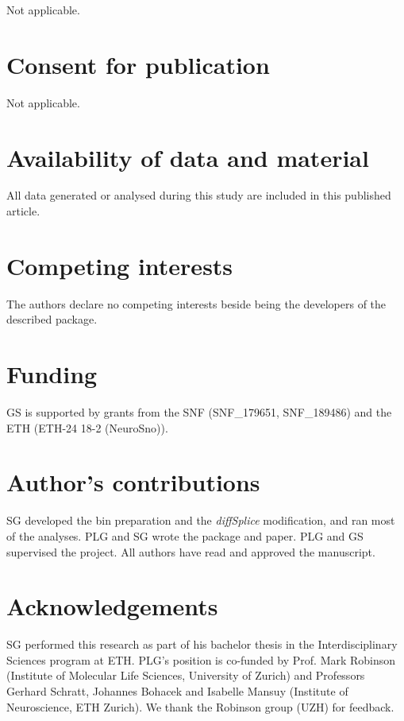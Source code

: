 \documentclass{bmcart}
\begin{document}
\begin{backmatter}
Not applicable.

\section*{Consent for publication}

Not applicable.

\section*{Availability of data and material}
All data generated or analysed during this study are included in this published article.

\section*{Competing interests}
The authors declare no competing interests beside being the developers of the described package.

\section*{Funding}
GS is supported by grants from the SNF (SNF\_179651, SNF\_189486) and the ETH (ETH-24 18-2 (NeuroSno)).

\section*{Author's contributions}
SG developed the bin preparation and the \textit{diffSplice} modification, and ran most of the analyses. PLG and SG wrote the package and paper. PLG and GS supervised the project. All authors have read and approved the manuscript.

\section*{Acknowledgements}
SG performed this research as part of his bachelor thesis in the Interdisciplinary Sciences program at ETH. PLG's position is co-funded by Prof. Mark Robinson (Institute of Molecular Life Sciences, University of Zurich) and Professors Gerhard Schratt, Johannes Bohacek and Isabelle Mansuy (Institute of Neuroscience, ETH Zurich). We thank the Robinson group (UZH) for feedback.



\end{backmatter}
\end{document}
